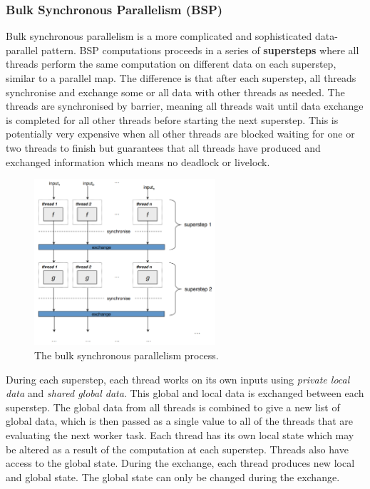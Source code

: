 \documentclass[CS4204-Notes.tex]{subfiles}
\begin{document}
\subsubsection{Bulk Synchronous Parallelism (BSP)}
Bulk synchronous parallelism is a more complicated and sophisticated data-parallel pattern. BSP computations proceeds in a series of \textbf{supersteps} where all threads perform the same computation on different data on each superstep, similar to a parallel map. The difference is that after each superstep, all threads synchronise and exchange some or all data with other threads as needed. The threads are synchronised by barrier, meaning all threads wait until data exchange is completed for all other threads before starting the next superstep. This is potentially very expensive when all other threads are blocked waiting for one or two threads to finish but guarantees that all threads have produced and exchanged information which means no deadlock or livelock. 
\begin{figure}[H]
\centering
\includegraphics[width=0.6\textwidth, keepaspectratio]{imgs/bsp.png}
\caption{The bulk synchronous parallelism process.}
\end{figure}
\noindent
During each superstep, each thread works on its own inputs using \textit{private local data} and \textit{shared global data}. This global and local data is exchanged between each superstep. The global data from all threads is combined to give a new list of global data, which is then passed as a single value to all of the threads that are evaluating the next worker task. Each thread has its own local state which may be altered as a result of the computation at each superstep. Threads also have access to the global state. During the exchange, each thread produces new local and global state. The global state can only be changed during the exchange. 
\end{document}
